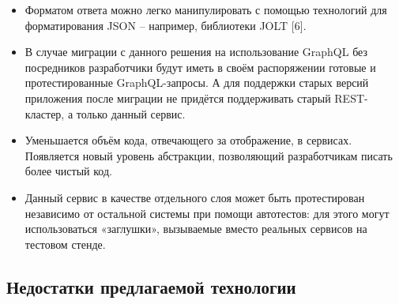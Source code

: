 \begin{itemize}
    \item Форматом ответа можно легко манипулировать с помощью технологий для форматирования JSON – например, библиотеки JOLT [6].
    \item В случае миграции с данного решения на использование GraphQL без посредников разработчики будут иметь в своём распоряжении готовые и протестированные GraphQL-запросы.
    А для поддержки старых версий приложения после миграции не придётся поддерживать старый REST-кластер, а только данный сервис.
    \item Уменьшается объём кода, отвечающего за отображение, в сервисах.
    Появляется новый уровень абстракции, позволяющий разработчикам писать более чистый код.
    \item Данный сервис в качестве отдельного слоя может быть протестирован независимо от остальной системы при помощи автотестов: для этого могут использоваться «заглушки», вызываемые вместо реальных сервисов на тестовом стенде.
\end{itemize}

\subsection{Недостатки предлагаемой технологии}\label{subsec:proposed-technology-disadvantages}

